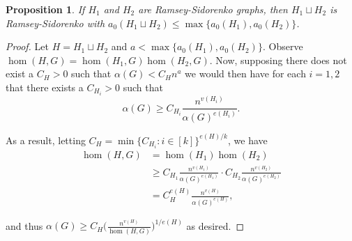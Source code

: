 \documentclass[12pt]{article}
\newtheorem{proposition}[theorem]{Proposition}
\begin{document}
\begin{proposition}
\label{prop: disconnected Ramsey-Sidorenko}
    If $H_1$ and $H_2$ are Ramsey-Sidorenko graphs, then $H_1\sqcup H_2$ is Ramsey-Sidorenko with $a_0(H_1\sqcup H_2)\leq\max\{a_0(H_1),a_0(H_2)\}$.
\end{proposition}
\begin{proof}
Let $H=H_1\sqcup H_2$ and $a<\max\{a_0(H_1),a_0(H_2)\}$. Observe $\hom(H,G)=\hom(H_1,G)\hom(H_2,G)$. Now, supposing there does not exist a $C_H>0$ such that $\alpha(G)< C_Hn^a$ we would then have for each $i=1,2$ that there exists a $C_{H_i}>0$ such that
\[
\alpha(G)\geq C_{H_i}\frac{n^{v(H_i)}}{\alpha(G)^{e(H_i)}}.
\]

As a result, letting $C_H=\min\{C_{H_i}:i\in[k]\}^{e(H)/k}$, we have
\begin{align*}
    \hom(H,G)&=\hom(H_1)\hom(H_2)\\
    &\geq C_{H_1}\frac{n^{v(H_1)}}{\alpha(G)^{e(H_1)}}\cdot C_{H_2}\frac{n^{v(H_2)}}{\alpha(G)^{e(H_2)}}\\
    &=C_H^{e(H)}\frac{n^{v(H)}}{\alpha(G)^{e(H)}},
\end{align*}

and thus $\alpha(G)\geq C_H\bigl(\frac{n^{v(H)}}{\hom(H,G)}\bigr)^{1/e(H)}$ as desired.
\end{proof}
\end{document}

